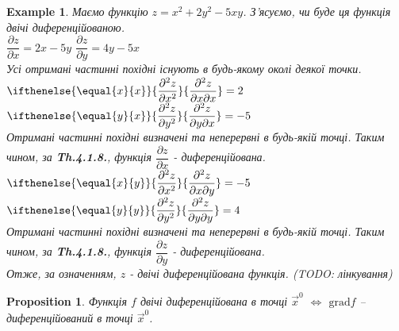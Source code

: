 \documentclass[a4paper, 10pt]{article}
\def\departial#1#2{\dfrac{\partial {#1}}{\partial {#2}}}
\def\seconddepartial#1#2#3{\ifthenelse{\equal{#2}{#3}}{\dfrac{\partial^2 {#1}}{\partial {#2}^2}}{\dfrac{\partial^2 {#1}}{\partial {#2} \partial {#3}}}}
\theoremstyle{theoremdd}
\theoremstyle{theoremdd}
\theoremstyle{theoremdd}
\theoremstyle{theoremdd}
\theoremstyle{theoremdd}
\newtheorem{example}[theorem]{Example}
\theoremstyle{theoremdd}
\newtheorem{proposition}[theorem]{Proposition}
\theoremstyle{theoremdd}
\theoremstyle{theoremdd}
\theoremstyle{theoremdd}
\newcommand\Norm[1]{\|#1\|}
\begin{document}
\begin{example}
Маємо функцію $z = x^2+2y^2-5xy$. З'ясуємо, чи буде ця функція двічі диференційованою.\\
$\departial{z}{x} = 2x-5y$ \hspace{1cm} $\departial{z}{y} = 4y-5x$\\
Усі отримані частинні похідні існують в будь-якому околі деякої точки.\\
$\seconddepartial{z}{x}{x} = 2$ \hspace{1cm} $\seconddepartial{z}{y}{x} = -5$\\
Отримані частинні похідні визначені та неперервні в будь-якій точці. Таким чином, за \textbf{Th.4.1.8.}, функція $\departial{z}{x}$ - диференційована.
$\seconddepartial{z}{x}{y} = -5$ \hspace{1cm} $\seconddepartial{z}{y}{y} = 4$\\
Отримані частинні похідні визначені та неперервні в будь-якій точці. Таким чином, за \textbf{Th.4.1.8.}, функція $\departial{z}{y}$ - диференційована.\\
Отже, за означенням, $z$ - двічі диференційована функція.
(TODO: лінкування)
\end{example}

\begin{proposition}
Функція $f$ двічі диференційована в точці $\vec{x}^0$ $\iff$ $\textrm{grad} f$ -- диференційований в точці $\vec{x}^0$.
\iffalse
\begin{align*}
\textrm{grad} f(\vec{x}) - \textrm{grad} f(\vec{x}^0) = M \Delta \vec{x} + o(\Norm{\Delta \vec{x}}), \Delta \vec{x} \to \vec{0}
\end{align*}
де $M$ - матриця всіх часткових похідних $\textrm{grad} f(\vec{x})$ - \textbf{матриця Гесе}
\begin{align*}
f''(\vec{x}) = M = \begin{pmatrix}
\dfrac{\partial^2 f}{(\partial x_1)^2} & \dfrac{\partial^2 f}{\partial x_2 \partial x_1} & \dots & \dfrac{\partial^2 f}{\partial x_n \partial x_1} \\
\dfrac{\partial^2 f}{\partial x_1 \partial x_2} & \dfrac{\partial^2 f}{(\partial x_2)^2} & \dots & \dfrac{\partial^2 f}{\partial x_n \partial x_2} \\
\vdots & \vdots & \ddots & \vdots \\
\dfrac{\partial^2 f}{(\partial x_1 \partial x_n} & \dfrac{\partial^2 f}{\partial x_2 \partial x_n} & \dots & \dfrac{\partial^2 f}{(\partial x_n)^2} \\
\end{pmatrix}(\vec{x})
\end{align*}
\fi
\end{proposition}
\end{document}
